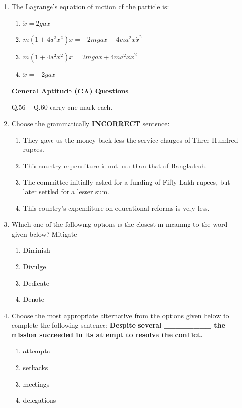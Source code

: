 \documentclass[journal,12pt,onecolumn]{IEEEtran}
\theoremstyle{remark}
\begin{document}
\begin{enumerate}
\item The Lagrange's equation of motion of the particle is:
\begin{multicols}{2}
\begin{enumerate}[label=\Alph*)]
    \item $ \ddot{x} = 2gax $
    \item $ m(1 + 4a^2 x^2) \ddot{x} = -2mgax - 4ma^2 x\dot{x}^2 $
    \item $ m(1 + 4a^2 x^2) \ddot{x} = 2mgax + 4ma^2 x\dot{x}^2 $
    \item $ \ddot{x} = -2gax $
\end{enumerate}
\end{multicols}
\textbf{General Aptitude (GA) Questions}

Q.56 -- Q.60 carry one mark each.

\item Choose the grammatically \textbf{INCORRECT} sentence:

\begin{enumerate}
    \item They gave us the money back less the service charges of Three Hundred rupees.
    \item This country expenditure is not less than that of Bangladesh.
    \item The committee initially asked for a funding of Fifty Lakh rupees, but later settled for a lesser sum.
    \item This country's expenditure on educational reforms is very less.
\end{enumerate}


\item Which one of the following options is the closest in meaning to the word given below? 
Mitigate
\begin{multicols}{4}
\begin{enumerate}
    \item Diminish
    \item Divulge
    \item Dedicate
    \item Denote
\end{enumerate}
\end{multicols}

\item Choose the most appropriate alternative from the options given below to complete the following sentence: 
\textbf{Despite several \_\_\_\_\_\_\_\_ the mission succeeded in its attempt to resolve the conflict.}
\begin{multicols}{4}
\begin{enumerate}[label=\Alph*)]
    \item attempts
    \item setbacks
    \item meetings
    \item delegations
\end{enumerate}
\end{multicols}


\end{enumerate}
\end{document}
